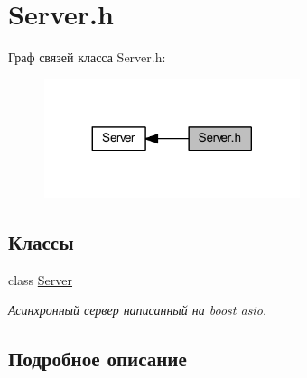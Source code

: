 \hypertarget{group__serverh}{}\section{Server.\+h}
\label{group__serverh}
Граф связей класса Server.\+h\+:
\nopagebreak
\begin{figure}[H]
\begin{center}
\leavevmode
\includegraphics[width=212pt]{group__serverh}
\end{center}
\end{figure}
\subsection*{Классы}
\begin{DoxyCompactItemize}
\item 
class \mbox{\hyperlink{class_server}{Server}}
\begin{DoxyCompactList}\small\item\em Асинхронный сервер написанный на boost asio. \end{DoxyCompactList}\end{DoxyCompactItemize}


\subsection{Подробное описание}
